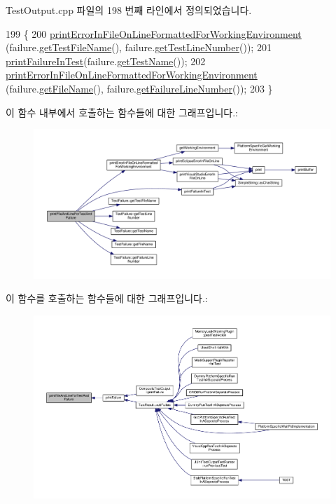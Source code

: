 Test\+Output.\+cpp 파일의 198 번째 라인에서 정의되었습니다.


\begin{DoxyCode}
199 \{
200     \hyperlink{class_test_output_a56ae5964123fc91c7149a8274aa22db9}{printErrorInFileOnLineFormattedForWorkingEnvironment}
      (failure.\hyperlink{class_test_failure_a2fb8d164bb0730492e0140ec8080f13f}{getTestFileName}(), failure.\hyperlink{class_test_failure_a9fd9b831dfada83bbc2a1847918080a6}{getTestLineNumber}());
201     \hyperlink{class_test_output_a1748d410d65b95596df95234742258a3}{printFailureInTest}(failure.\hyperlink{class_test_failure_a02da3865d8c38e5fd122a08a5e23773e}{getTestName}());
202     \hyperlink{class_test_output_a56ae5964123fc91c7149a8274aa22db9}{printErrorInFileOnLineFormattedForWorkingEnvironment}
      (failure.\hyperlink{class_test_failure_ac74fa65c497d9a175304a14ffafcaa1a}{getFileName}(), failure.\hyperlink{class_test_failure_a9d41f8ad9667ed1f471676d49a655ec7}{getFailureLineNumber}());
203 \}
\end{DoxyCode}


이 함수 내부에서 호출하는 함수들에 대한 그래프입니다.\+:
\nopagebreak
\begin{figure}[H]
\begin{center}
\leavevmode
\includegraphics[width=350pt]{class_test_output_ae20c439e68036cc705a86d9a95954168_cgraph}
\end{center}
\end{figure}




이 함수를 호출하는 함수들에 대한 그래프입니다.\+:
\nopagebreak
\begin{figure}[H]
\begin{center}
\leavevmode
\includegraphics[width=350pt]{class_test_output_ae20c439e68036cc705a86d9a95954168_icgraph}
\end{center}
\end{figure}


